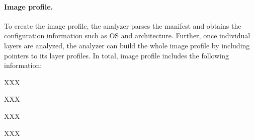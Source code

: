 

%
%


\paragraph{Image profile.}

To create the image profile, the analyzer parses the manifest
and obtains the configuration information such as OS and architecture.
Further, once individual layers are analyzed, the analyzer can build the whole image
profile by including pointers to its layer profiles. In total, image profile includes
the following information:

\begin{compactitemize}
	\item XXX
	\item XXX
	\item XXX
	\item XXX
\end{compactitemize}


%

